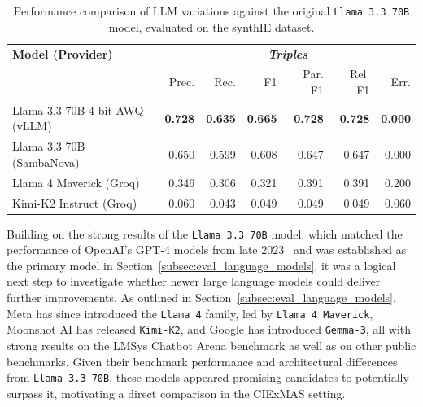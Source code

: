 \documentclass[a4paper,oneside,bibliography=totoc]{scrbook}
\begin{document}
\begin{table}[h]
  \centering
  \begin{tabular}{p{5cm}|rrrrrr}
    \toprule
    \textbf{Model (Provider)}      & \multicolumn{6}{c}{\textit{\textbf{Triples}}}                                                                                      \\
                                   & Prec.                                         & Rec.           & F1             & Par. F1        & Rel. F1        & Err.           \\
    \midrule
    Llama 3.3 70B 4-bit AWQ (vLLM) & \textbf{0.728}                                & \textbf{0.635} & \textbf{0.665} & \textbf{0.728} & \textbf{0.728} & \textbf{0.000} \\
    Llama 3.3 70B (SambaNova)      & 0.650                                         & 0.599          & 0.608          & 0.647          & 0.647          & 0.000          \\
    Llama 4 Maverick (Groq)        & 0.346                                         & 0.306          & 0.321          & 0.391          & 0.391          & 0.200          \\
    Kimi-K2 Instruct (Groq)        & 0.060                                         & 0.043          & 0.049          & 0.049          & 0.049          & 0.060          \\
    \bottomrule
  \end{tabular}
  \caption{Performance comparison of \ac{LLM} variations against the original \texttt{Llama 3.3 70B} model, evaluated on the synthIE dataset.}
  \label{tab:model_variation_comparison}
\end{table}

Building on the strong results of the \texttt{Llama 3.3 70B} model, which matched the performance of OpenAI’s GPT-4 models from late 2023~\cite{Chiang2024} and was established as the primary model in Section~\ref{subsec:eval_language_models}, it was a logical next step to investigate whether newer large language models could deliver further improvements. As outlined in Section~\ref{subsec:eval_language_models}, Meta has since introduced the \texttt{Llama 4} family, led by \texttt{Llama 4 Maverick}, Moonshot AI has released \texttt{Kimi-K2}, and Google has introduced \texttt{Gemma-3}, all with strong results on the LMSys Chatbot Arena benchmark as well as on other public benchmarks. Given their benchmark performance and architectural differences from \texttt{Llama 3.3 70B}, these models appeared promising candidates to potentially surpass it, motivating a direct comparison in the CIExMAS setting.
\end{document}
